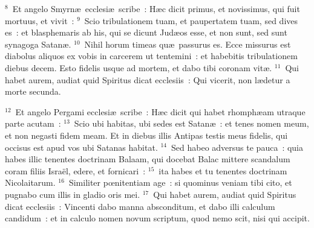 ${}^{8}$~Et angelo Smyrn\ae\ ecclesi\ae\ scribe~: H\ae c dicit primus, et novissimus, qui fuit mortuus, et vivit~:
${}^{9}$~Scio tribulationem tuam, et paupertatem tuam, sed dives es~: et blasphemaris ab his, qui se dicunt Jud\ae os esse, et non sunt, sed sunt synagoga Satan\ae .
${}^{10}$~Nihil horum timeas qu\ae\ passurus es. Ecce missurus est diabolus aliquos ex vobis in carcerem ut tentemini~: et habebitis tribulationem diebus decem. Esto fidelis usque ad mortem, et dabo tibi coronam vit\ae .
${}^{11}$~Qui habet aurem, audiat quid Spiritus dicat ecclesiis~: Qui vicerit, non l\ae detur a morte secunda.


${}^{12}$~Et angelo Pergami ecclesi\ae\ scribe~: H\ae c dicit qui habet rhomph\ae am utraque parte acutam~:
${}^{13}$~Scio ubi habitas, ubi sedes est Satan\ae~: et tenes nomen meum, et non negasti fidem meam. Et in diebus illis Antipas testis meus fidelis, qui occisus est apud vos ubi Satanas habitat.
${}^{14}$~Sed habeo adversus te pauca~: quia habes illic tenentes doctrinam Balaam, qui docebat Balac mittere scandalum coram filiis Isra\"el, edere, et fornicari~:
${}^{15}$~ita habes et tu tenentes doctrinam Nicolaitarum.
${}^{16}$~Similiter pœnitentiam age~: si quominus veniam tibi cito, et pugnabo cum illis in gladio oris mei.
${}^{17}$~Qui habet aurem, audiat quid Spiritus dicat ecclesiis~: Vincenti dabo manna absconditum, et dabo illi calculum candidum~: et in calculo nomen novum scriptum, quod nemo scit, nisi qui accipit.


